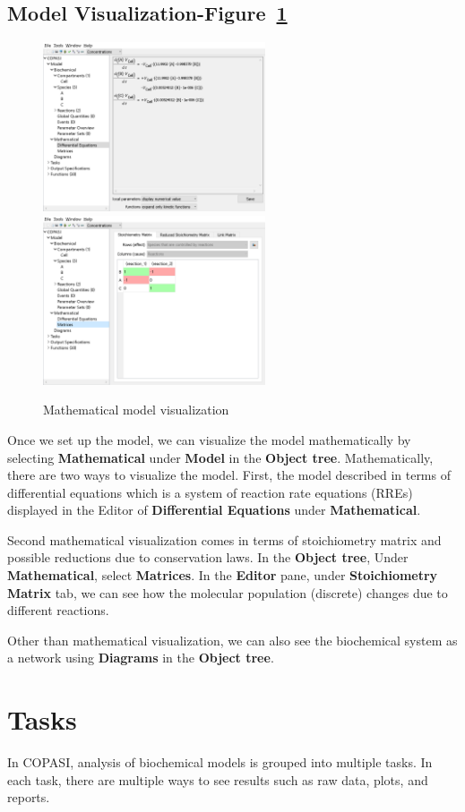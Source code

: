\documentclass[10pt]{article}
\theoremstyle{definition}
\theoremstyle{remark}
\begin{document}
\subsection{Model Visualization-Figure~\ref{6png}}
	\begin{figure}[!htb]
		\centering
		\includegraphics[height=5cm]{Images/6a.png}
		\includegraphics[height=5cm]{Images/6b.png}
		\caption{Mathematical model visualization}
		\label{6png}
	\end{figure}
    Once we set up the model, we can visualize the model mathematically by selecting \textbf{Mathematical} under \textbf{Model} in the \textbf{Object tree}. Mathematically, there are two ways to visualize the model. First, the model described in terms of differential equations which is a system of reaction rate equations (RREs) displayed in the Editor of \textbf{Differential Equations} under \textbf{Mathematical}. 
    

Second mathematical visualization comes in terms of stoichiometry matrix and possible reductions due to conservation laws.  In the \textbf{Object tree}, Under \textbf{Mathematical}, select \textbf{Matrices}. In the \textbf{Editor} pane, under \textbf{Stoichiometry Matrix} tab, we can see how the molecular population (discrete) changes due to different reactions.

	Other than mathematical visualization, we can also see the biochemical system as a network using \textbf{Diagrams} in the \textbf{Object tree}.
	
	\section{Tasks}
	In COPASI, analysis of biochemical models is grouped into multiple tasks. In each task, there are multiple ways to see results such as raw data, plots, and reports. 
	
\end{document}
